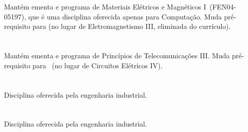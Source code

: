 \documentclass[]{article}
\begin{document}
\section{\MatEle}
Mantém ementa e programa de Materiais Elétricos e Magnéticos I~(FEN04-05197), que é uma disciplina oferecida apenas para Computação. Muda pré-requisito para \FisIII (no lugar de Eletromagnetismo III, eliminada do currículo).

\section{\PrincTelec}
Mantém ementa e programa de Princípios de Telecomunicações III. Muda pré-requisito para \CEVI~(no lugar de Circuitos Elétricos IV).

\section{\SegHig}
Disciplina oferecida pela engenharia industrial.

\section{\MetQuant}
Disciplina oferecida pela engenharia industrial.
\end{document}
